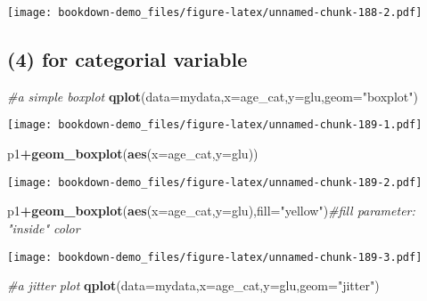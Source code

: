 \documentclass[]{book}
\newenvironment{Shaded}{\begin{snugshade}}{\end{snugshade}}
\newcommand{\KeywordTok}[1]{\textcolor[rgb]{0.13,0.29,0.53}{\textbf{#1}}}
\newcommand{\DataTypeTok}[1]{\textcolor[rgb]{0.13,0.29,0.53}{#1}}
\newcommand{\StringTok}[1]{\textcolor[rgb]{0.31,0.60,0.02}{#1}}
\newcommand{\CommentTok}[1]{\textcolor[rgb]{0.56,0.35,0.01}{\textit{#1}}}
\newcommand{\OperatorTok}[1]{\textcolor[rgb]{0.81,0.36,0.00}{\textbf{#1}}}
\newcommand{\NormalTok}[1]{#1}
\theoremstyle{definition}
\theoremstyle{definition}
\theoremstyle{definition}
\theoremstyle{remark}
\begin{document}
\texttt{[image: bookdown-demo\_files/figure-latex/unnamed-chunk-188-2.pdf]}

\subsection{(4) for categorial variable}\label{for-categorial-variable}

\begin{Shaded}
\begin{Highlighting}[]
\CommentTok{#a simple boxplot}
\KeywordTok{qplot}\NormalTok{(}\DataTypeTok{data=}\NormalTok{mydata,}\DataTypeTok{x=}\NormalTok{age_cat,}\DataTypeTok{y=}\NormalTok{glu,}\DataTypeTok{geom=}\StringTok{"boxplot"}\NormalTok{)}
\end{Highlighting}
\end{Shaded}

\texttt{[image: bookdown-demo\_files/figure-latex/unnamed-chunk-189-1.pdf]}

\begin{Shaded}
\begin{Highlighting}[]
\NormalTok{p1}\OperatorTok{+}\KeywordTok{geom_boxplot}\NormalTok{(}\KeywordTok{aes}\NormalTok{(}\DataTypeTok{x=}\NormalTok{age_cat,}\DataTypeTok{y=}\NormalTok{glu))}
\end{Highlighting}
\end{Shaded}

\texttt{[image: bookdown-demo\_files/figure-latex/unnamed-chunk-189-2.pdf]}

\begin{Shaded}
\begin{Highlighting}[]
\NormalTok{p1}\OperatorTok{+}\KeywordTok{geom_boxplot}\NormalTok{(}\KeywordTok{aes}\NormalTok{(}\DataTypeTok{x=}\NormalTok{age_cat,}\DataTypeTok{y=}\NormalTok{glu),}\DataTypeTok{fill=}\StringTok{"yellow"}\NormalTok{)}\CommentTok{#fill parameter: "inside" color}
\end{Highlighting}
\end{Shaded}

\texttt{[image: bookdown-demo\_files/figure-latex/unnamed-chunk-189-3.pdf]}

\begin{Shaded}
\begin{Highlighting}[]
\CommentTok{#a jitter plot}
\KeywordTok{qplot}\NormalTok{(}\DataTypeTok{data=}\NormalTok{mydata,}\DataTypeTok{x=}\NormalTok{age_cat,}\DataTypeTok{y=}\NormalTok{glu,}\DataTypeTok{geom=}\StringTok{"jitter"}\NormalTok{)}
\end{Highlighting}
\end{Shaded}
\end{document}
